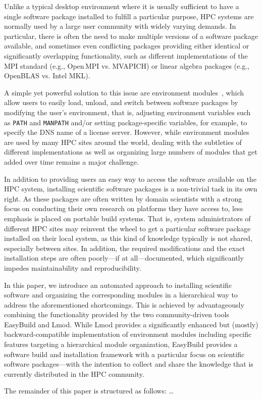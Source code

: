 Unlike a typical desktop environment where it is usually sufficient to have a
single software package installed to fulfill a particular purpose, HPC
systems are normally used by a large user community with widely varying
demands. In particular, there is often the need to make multiple versions of
a software package available, and sometimes even conflicting packages
providing either identical or significantly overlapping functionality, such
as different implementations of the MPI standard (e.g., Open\,MPI vs.
MVAPICH) or linear algebra packages (e.g., OpenBLAS vs. Intel MKL).

A simple yet powerful solution to this issue are environment
modules~\cite{furlani91,furlani96,eadline,cmod,laytonEM1}, which allow
users to easily load, unload, and switch between software packages by
modifying the user's environment, that is, adjusting environment
variables such as \texttt{PATH} and \texttt{MANPATH} and/or setting
package-specific variables, for example, to specify the DNS name of a
license server. However, while environment modules are used by many
HPC sites around the world, dealing with the subtleties of different
implementations as well as organizing large numbers of modules that
get added over time remains a major challenge.

In addition to providing users an easy way to access the software available
on the HPC system, installing scientific software packages is a non-trivial
task in its own right. As these packages are often written by domain
scientists with a strong focus on conducting their own research on platforms
they have access to, less emphasis is placed on portable build systems. That
is, system administrators of different HPC sites may reinvent the wheel to
get a particular software package installed on their local system, as this
kind of knowledge typically is not shared, especially between sites. In
addition, the required modifications and the exact installation steps are
often poorly---if at all---documented, which significantly impedes
maintainability and reproducibility.

In this paper, we introduce an automated approach to installing scientific
software and organizing the corresponding modules in a hierarchical way to
address the aforementioned shortcomings. This is achieved by advantageously
combining the functionality provided by the two community-driven tools
EasyBuild and Lmod. While Lmod provides a significantly enhanced but (mostly)
backward-compatible implementation of environment modules including specific
features targeting a hierarchical module organization, EasyBuild provides a
software build and installation framework with a particular focus on
scientific software packages---with the intention to collect and share the
knowledge that is currently distributed in the HPC community.

The remainder of this paper is structured as follows: \ldots

